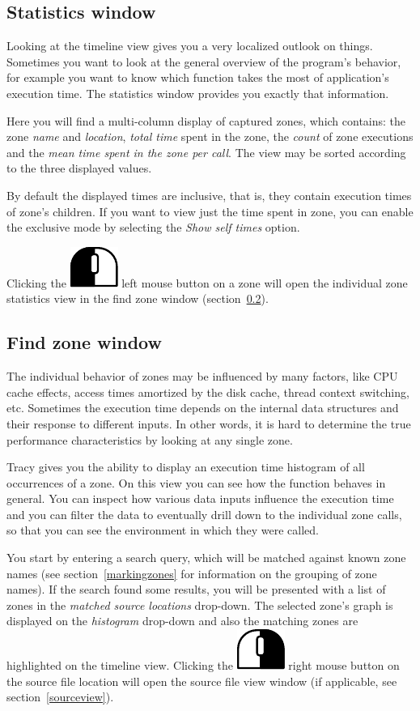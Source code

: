 \documentclass[hidelinks,titlepage,a4paper]{article}
\newcommand{\LMB}{\includegraphics[height=.8\baselineskip]{icons/lmb}}
\newcommand{\RMB}{\includegraphics[height=.8\baselineskip]{icons/rmb}}
\begin{document}
\subsection{Statistics window}
\label{statistics}

Looking at the timeline view gives you a very localized outlook on things. Sometimes you want to look at the general overview of the program's behavior, for example you want to know which function takes the most of application's execution time. The statistics window provides you exactly that information.

Here you will find a multi-column display of captured zones, which contains: the zone \emph{name} and \emph{location}, \emph{total time} spent in the zone, the \emph{count} of zone executions and the \emph{mean time spent in the zone per call}. The view may be sorted according to the three displayed values.

By default the displayed times are inclusive, that is, they contain execution times of zone's children. If you want to view just the time spent in zone, you can enable the exclusive mode by selecting the \emph{\faClock{} Show self times} option.

Clicking the \LMB{} left mouse button on a zone will open the individual zone statistics view in the find zone window (section~\ref{findzone}).

\subsection{Find zone window}
\label{findzone}

The individual behavior of zones may be influenced by many factors, like CPU cache effects, access times amortized by the disk cache, thread context switching, etc. Sometimes the execution time depends on the internal data structures and their response to different inputs. In other words, it is hard to determine the true performance characteristics by looking at any single zone.

Tracy gives you the ability to display an execution time histogram of all occurrences of a zone. On this view you can see how the function behaves in general. You can inspect how various data inputs influence the execution time and you can filter the data to eventually drill down to the individual zone calls, so that you can see the environment in which they were called.

You start by entering a search query, which will be matched against known zone names (see section~\ref{markingzones} for information on the grouping of zone names). If the search found some results, you will be presented with a list of zones in the \emph{matched source locations} drop-down. The selected zone's graph is displayed on the \emph{histogram} drop-down and also the matching zones are highlighted on the timeline view. Clicking the \RMB{} right mouse button on the source file location will open the source file view window (if applicable, see section~\ref{sourceview}).
\end{document}

